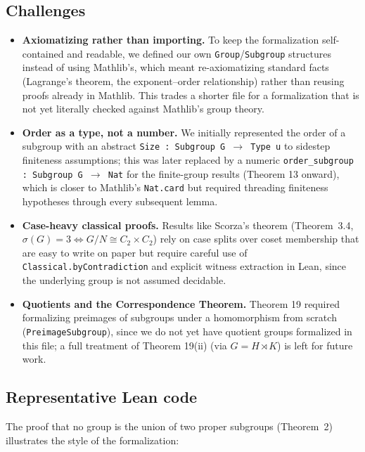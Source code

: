 \documentclass[12pt, a4paper]{article}
\theoremstyle{plain}
\theoremstyle{definition}
\begin{document}
\subsection{Challenges}
\begin{itemize}
  \item \textbf{Axiomatizing rather than importing.} To keep the
    formalization self-contained and readable, we defined our own
    \texttt{Group}/\texttt{Subgroup} structures instead of using Mathlib's,
    which meant re-axiomatizing standard facts (Lagrange's theorem, the
    exponent--order relationship) rather than reusing proofs already in
    Mathlib. This trades a shorter file for a formalization that is not yet
    literally checked against Mathlib's group theory.
  \item \textbf{Order as a type, not a number.} We initially represented the
    order of a subgroup with an abstract \texttt{Size : Subgroup G $\to$
    Type u} to sidestep finiteness assumptions; this was later replaced by
    a numeric \texttt{order\_subgroup : Subgroup G $\to$ Nat} for the
    finite-group results (Theorem 13 onward), which is closer to Mathlib's
    \texttt{Nat.card} but required threading finiteness hypotheses through
    every subsequent lemma.
  \item \textbf{Case-heavy classical proofs.} Results like Scorza's theorem
    (Theorem~3.4, $\sigma(G)=3 \iff G/N \cong C_2\times C_2$) rely on
    case splits over coset membership that are easy to write on paper but
    require careful use of \texttt{Classical.byContradiction} and explicit
    witness extraction in Lean, since the underlying group is not assumed
    decidable.
  \item \textbf{Quotients and the Correspondence Theorem.} Theorem 19
    required formalizing preimages of subgroups under a homomorphism from
    scratch (\texttt{PreimageSubgroup}), since we do not yet have quotient
    groups formalized in this file; a full treatment of Theorem 19(ii)
    (via $G = H \rtimes K$) is left for future work.
\end{itemize}

\subsection{Representative Lean code}
The proof that no group is the union of two proper subgroups
(Theorem~2) illustrates the style of the formalization:
\end{document}
